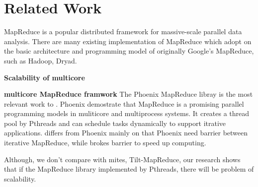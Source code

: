 \section{Related Work}
\label{sec:rel}
MapReduce is a popular distributed framework
for massive-scale parallel data analysis.
There are many existing implementation of MapReduce 
which adopt on the basic architecture and 
programming model of originally Google's MapReduce, 
such as Hadoop\cite{}, Dryad\cite{isard2007dryad}.

{\bf Scalability of multicore}

{\bf multicore MapReduce framwork}
The Phoenix MapReduce libray\cite{ranger2007phoenix} 
is the most relevant work to \myds. 
Phoenix demostrate that MapReduce is a promising parallel programming
models in muliticore and multiprocess systems.
It creates a thread pool by Pthreads
and can schedule tasks dynamically to support itrative applications.
\myds differs from Phoenix mainly on that 
Phoenix need barrier between iterative MapReduce,
while \myds brokes barrier to speed up computing.

Although, we don't compare \myds with mites, Tilt-MapReduce,
our research shows that if the MapReduce library implemented by Pthreads, there will be problem of scalability.
